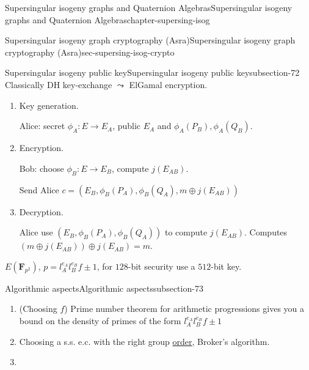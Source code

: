 \documentclass[oneside,10pt,]{book}
\numberwithin{equation}{section}
\newcommand{\FF}{\mathbf{F}}
\begin{document}
\begin{chapterptx}{Supersingular isogeny graphs and Quaternion Algebras}{}{Supersingular isogeny graphs and Quaternion Algebras}{}{}{chapter-supersing-isog}
\begin{sectionptx}{Supersingular isogeny graph cryptography (Asra)}{}{Supersingular isogeny graph cryptography (Asra)}{}{}{sec-supersing-isog-crypto}
%
%
\typeout{************************************************}
\typeout{************************************************}
%
\begin{subsectionptx}{Supersingular isogeny public key}{}{Supersingular isogeny public key}{}{}{subsection-72}
\hypertarget{p-853}{}%
Classically DH key-exchange \(\leadsto\) ElGamal encryption.%
\par
\hypertarget{p-854}{}%
\leavevmode%
\begin{enumerate}
\item\hypertarget{li-215}{}\hypertarget{p-855}{}%
Key generation.%
\par
\hypertarget{p-856}{}%
Alice: secret \(\phi_A \colon E \to E_A\), public \(E_A\) and \(\phi_A(P_B), \phi_A(Q_B)\).%
\item\hypertarget{li-216}{}\hypertarget{p-857}{}%
Encryption.%
\par
\hypertarget{p-858}{}%
Bob: choose \(\phi_B \colon E \to E_B\), compute \(j(E_{AB})\).%
\par
\hypertarget{p-859}{}%
Send Alice \(c = (E_B, \phi_B(P_A), \phi_B(Q_A), m\oplus j(E_{AB}))\)%
\item\hypertarget{li-217}{}\hypertarget{p-860}{}%
Decryption.%
\par
\hypertarget{p-861}{}%
Alice use \((E_B, \phi_B(P_A), \phi_B(Q_A))\) to compute \(j(E_{AB})\). Computes \((m\oplus j(E_{AB})) \oplus j(E_{AB}) = m\).%
\end{enumerate}
%
\par
\hypertarget{p-862}{}%
\(E(\FF_{p^2})\), \(p = l_A^{e_A} l_B^{e_B} f \pm 1\), for \(128\)-bit security use a \(512\)-bit key.%
\end{subsectionptx}
%
%
\typeout{************************************************}
\typeout{************************************************}
%
\begin{subsectionptx}{Algorithmic aspects}{}{Algorithmic aspects}{}{}{subsection-73}
\hypertarget{p-863}{}%
\leavevmode%
\begin{enumerate}
\item\hypertarget{li-218}{}(Choosing \(f\)) Prime number theorem for arithmetic progressions gives you a bound on the density of primes of the form \(l_A^{e_A} l_B^{e_B} f \pm 1\)%
\item\hypertarget{li-219}{}Choosing a s.s. e.c. with the right group \hyperref[def-order-quaternion]{order}, Broker's algorithm.%
\item\hypertarget{li-220}{}\hypertarget{p-864}{}%

\end{enumerate}
\end{subsectionptx}
\end{sectionptx}
\end{chapterptx}
\end{document}
